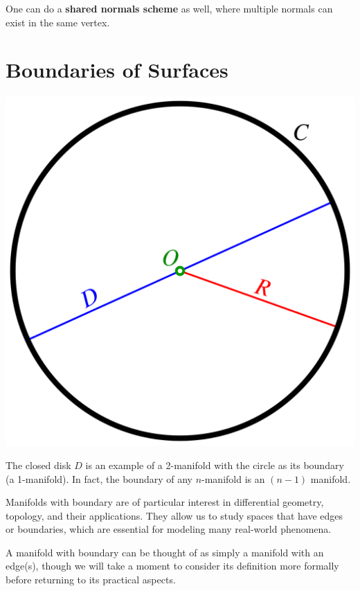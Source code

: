 \spa

One can do a \textbf{shared normals scheme} as well, where
multiple normals can exist in the same vertex.
\section{Boundaries of Surfaces} \label{boundary}


\begin{marginfigure}
    \centering
    \includegraphics[width=1.0\linewidth]{images/ClosedDisk.png}
    \caption{The closed disk $D$ is an example of a 2-manifold with the circle as its boundary (a 1-manifold).  In fact, the boundary of any $n$-manifold is an $(n - 1)$ manifold.}
\end{marginfigure}
Manifolds with boundary are of particular interest in differential geometry, topology, and their applications. They allow us to study spaces that have edges or boundaries, which are essential for modeling many real-world phenomena. 

A manifold with boundary can be thought of as simply a manifold with an edge(s), though we will take a moment to consider its definition more formally before returning to its practical aspects.      

